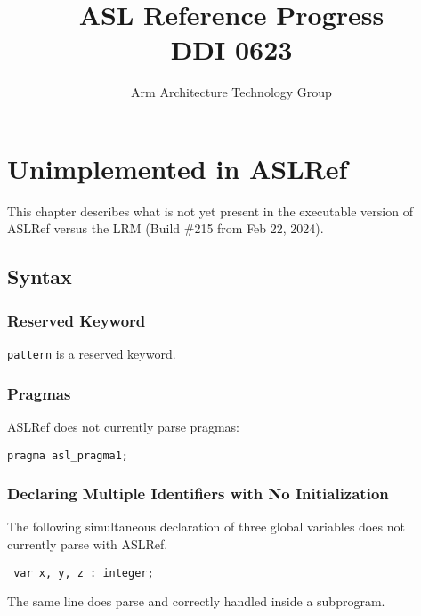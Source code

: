 \documentclass{book}
\author{Arm Architecture Technology Group}
\title{ASL Reference Progress \\
       DDI 0623}
\begin{document}
\maketitle

\tableofcontents{}





\chapter{Unimplemented in ASLRef}

This chapter describes what is not yet present in the executable version of ASLRef
versus the LRM (Build \#215 from Feb 22, 2024).

\section{Syntax}

\subsection{Reserved Keyword}
\texttt{pattern} is a reserved keyword.

\subsection{Pragmas}
ASLRef does not currently parse pragmas:
\begin{verbatim}
pragma asl_pragma1;
\end{verbatim}


\subsection{Declaring Multiple Identifiers with No Initialization}
The following simultaneous declaration of three global variables does not currently parse with ASLRef.
\begin{verbatim}
 var x, y, z : integer;
\end{verbatim}

The same line does parse and correctly handled inside a subprogram.
\end{document}
